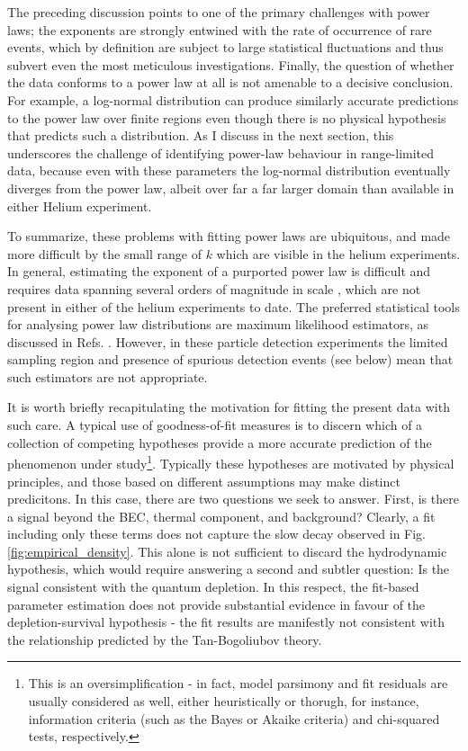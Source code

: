 	The preceding discussion points to one of the primary challenges with power laws; the exponents are strongly entwined with the rate of occurrence of rare events, which by definition are subject to large statistical fluctuations and thus subvert even the most meticulous investigations.
	{Finally, the question of whether the data conforms to a power law at all is not amenable to a decisive conclusion. 
	For example, a log-normal distribution can produce similarly accurate predictions to the power law over finite regions \cite{Virkar14,Clauset09} even though there is no physical hypothesis that predicts such a distribution. 
	As I discuss in the next section, this underscores the challenge of identifying power-law behaviour in range-limited data, because even with these parameters the log-normal distribution eventually diverges from the power law, albeit over far a far larger domain than available in either Helium experiment.}

	To summarize, these problems with fitting power laws are ubiquitous, and made more difficult by the small range of $k$ which are visible in the helium experiments.
	In general, estimating the exponent of a purported power law is difficult and requires data spanning several orders of magnitude in scale \cite{Goldstein04,Clauset09,Virkar14,Hanel17}, which are not present in either {of the} helium experiment{s to date}.
	The preferred statistical tools for analysing power law distributions are maximum likelihood estimators, as discussed in Refs. \cite{Clauset09,Virkar14}.
	However, in these particle detection experiments the limited sampling region and presence of spurious detection events (see below) mean that such estimators are not appropriate.
	

	It is worth briefly recapitulating the motivation for fitting the present data with such care. A typical use of goodness-of-fit measures is to discern which of a collection of competing hypotheses provide a more accurate prediction of the phenomenon under study\footnote{This is an oversimplification - in fact, model parsimony and fit residuals are usually considered as well, either heuristically or thorugh, for instance, information criteria (such as the Bayes or Akaike criteria) and chi-squared tests, respectively.}. Typically these hypotheses are motivated by physical principles, and those based on different assumptions may make distinct predicitons. In this case, there are two questions we seek to answer. First, is there a signal beyond the BEC, thermal component, and background? Clearly, a fit including only these terms does not capture the slow decay observed in Fig. \ref{fig:empirical_density}. This alone is not sufficient to discard the hydrodynamic hypothesis, which would require answering a second and subtler question: Is the signal  consistent with the quantum depletion. In this respect, the fit-based parameter estimation does not provide substantial evidence in favour of the depletion-survival hypothesis - the fit results are manifestly not consistent with the relationship predicted by the Tan-Bogoliubov theory.

